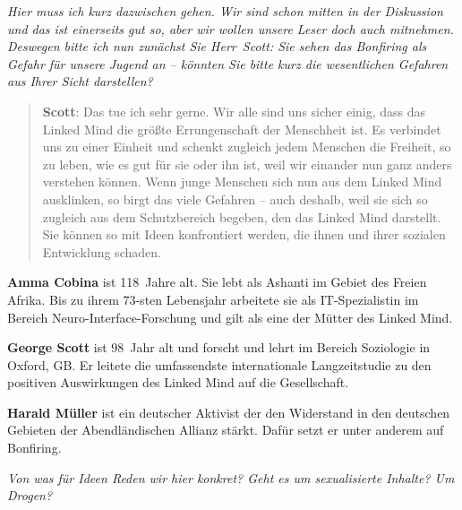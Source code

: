 \documentclass{scrartcl}
\newenvironment{frage}{\itshape}{}
\newenvironment{antworta}{
  \begin{quotation}
  }{
  \end{quotation}
}
\newcommand{\name}[1]{\textbf{#1}}
\newenvironment{infobox}{%
  \begin{tcolorbox}[width=\linewidth,
     boxsep=10pt,
     left=0pt,
     right=0pt,
     top=10pt,
     title=Zu den Personen,
     ]%
   }{%
   \end{tcolorbox}%
}
\begin{document}
\begin{frage}
Hier muss ich kurz dazwischen gehen. Wir sind schon mitten
  in der Diskussion und das ist einerseits gut so, aber wir
  wollen unsere Leser doch auch mitnehmen. Deswegen bitte
  ich nun zunächst Sie Herr~Scott: Sie sehen das Bonfiring
  als Gefahr für unsere Jugend an – könnten Sie bitte kurz
  die wesentlichen Gefahren aus Ihrer Sicht darstellen?
\end{frage}


\begin{antworta}
\name{Scott}: Das tue ich sehr gerne. Wir alle sind uns sicher
    einig, dass das Linked Mind die größte Errungenschaft
    der Menschheit ist. Es verbindet uns zu einer Einheit
    und schenkt zugleich jedem Menschen die Freiheit, so zu
    leben, wie es gut für sie oder ihn ist, weil wir
    einander nun ganz anders verstehen können. Wenn junge
    Menschen sich nun aus dem Linked Mind ausklinken, so
    birgt das viele Gefahren – auch deshalb, weil sie sich
    so zugleich aus dem Schutzbereich begeben, den das
    Linked Mind darstellt. Sie können so mit Ideen
    konfrontiert werden, die ihnen und ihrer sozialen
    Entwicklung schaden.
\end{antworta}


\begin{infobox}
\name{Amma Cobina} ist 118~Jahre alt. Sie lebt als Ashanti im
Gebiet des Freien Afrika. Bis zu ihrem 73-sten Lebensjahr
arbeitete sie als IT-Spezialistin im Bereich
Neuro-Interface-Forschung und gilt als eine der Mütter des
Linked Mind.

\name{George Scott} ist 98~Jahr alt und forscht und lehrt im
Bereich Soziologie in Oxford, GB. Er leitete die
umfassendste internationale Langzeitstudie zu den positiven
Auswirkungen des Linked Mind auf die Gesellschaft.

\name{Harald Müller} ist ein deutscher Aktivist der den
Widerstand in den deutschen Gebieten der Abendländischen
Allianz stärkt. Dafür setzt er unter anderem auf Bonfiring.
\end{infobox}


\begin{frage}
Von was für Ideen Reden wir hier konkret? Geht es um
 sexualisierte Inhalte? Um Drogen?
\end{frage}
\end{document}
